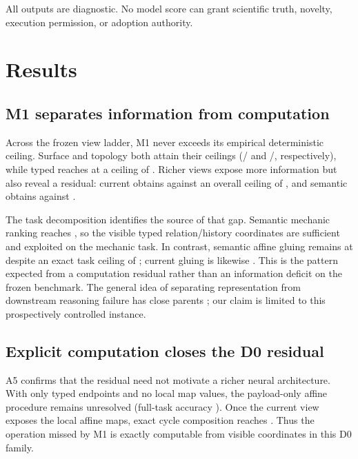 \documentclass[10pt]{article}
\begin{document}
All outputs are diagnostic. No model score can grant scientific truth, novelty, execution permission, or adoption authority.

\section{Results}



\subsection{M1 separates information from computation}

Across the frozen view ladder, M1 never exceeds its empirical deterministic ceiling. Surface and topology both attain their ceilings (\MOneSurfaceAccuracy/\MOneSurfaceCeiling{} and \MOneTopologyAccuracy/\MOneTopologyCeiling{}, respectively), while typed reaches \MOneTypedAccuracy{} at a ceiling of \MOneTypedCeiling{}. Richer views expose more information but also reveal a residual: current obtains \MOneCurrentAccuracy{} against an overall ceiling of \MOneCurrentCeiling{}, and semantic obtains \MOneSemanticAccuracy{} against \MOneSemanticCeiling{}.

The task decomposition identifies the source of that gap. Semantic mechanic ranking reaches \MOneSemanticMechanicAccuracy{}, so the visible typed relation/history coordinates are sufficient and exploited on the mechanic task. In contrast, semantic affine gluing remains at \MOneSemanticGluingAccuracy{} despite an exact task ceiling of \MOneSemanticGluingCeiling{}; current gluing is likewise \MOneCurrentGluingAccuracy{}. This is the pattern expected from a computation residual rather than an information deficit on the frozen benchmark. The general idea of separating representation from downstream reasoning failure has close parents \citep{liem2026temporal,anonymous2026chokepoints}; our claim is limited to this prospectively controlled instance.

\subsection{Explicit computation closes the D0 residual}

A5 confirms that the residual need not motivate a richer neural architecture. With only typed endpoints and no local map values, the payload-only affine procedure remains unresolved (full-task accuracy \AFiveTypedAccuracy{}). Once the current view exposes the local affine maps, exact cycle composition reaches \AFiveCurrentAccuracy{}. Thus the operation missed by M1 is exactly computable from visible coordinates in this D0 family.
\end{document}
